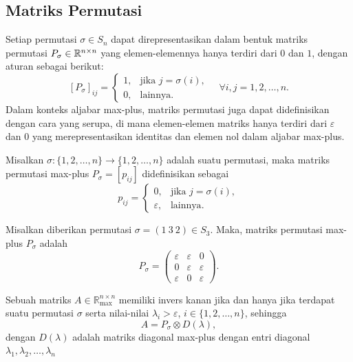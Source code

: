 \subsection{Matriks Permutasi}
Setiap permutasi $\sigma \in S_n$ dapat direpresentasikan dalam bentuk matriks permutasi $P_{\sigma}\in\mathbb{R}^{n \times n}$ yang elemen-elemennya hanya terdiri dari $0$ dan $1$, dengan aturan sebagai berikut:
\[
  [P_{\sigma}]_{ij} =
  \begin{cases}
    1, & \text{jika } j = \sigma(i), \\
    0, & \text{lainnya}.
  \end{cases} \quad \forall i, j = 1, 2, \ldots, n.
\]
Dalam konteks aljabar max-plus, matriks permutasi juga dapat didefinisikan dengan cara yang serupa, di mana elemen-elemen matriks hanya terdiri dari $\varepsilon$ dan $0$ yang merepresentasikan identitas dan elemen nol dalam aljabar max-plus.
\begin{definisi}\label{def:matriks_permutasi}
  Misalkan $\sigma : \{1,2,\dots,n\} \to \{1,2,\dots,n\}$
  adalah suatu permutasi, maka matriks permutasi max-plus
  $P_{\sigma} = [p_{ij}]$ didefinisikan sebagai
  \[
    p_{ij} =
    \begin{cases}
      0,           & \text{jika } j = \sigma(i), \\[4pt]
      \varepsilon, & \text{lainnya}.
    \end{cases}
  \]
\end{definisi}

\begin{contoh}
  Misalkan diberikan permutasi $\sigma=(1\ 3\ 2)\in S_3$. Maka, matriks permutasi max-plus $P_{\sigma}$ adalah
  \[
    P_{\sigma} =
    \begin{pmatrix}
      \varepsilon & \varepsilon & 0           \\
      0           & \varepsilon & \varepsilon \\
      \varepsilon & 0           & \varepsilon
    \end{pmatrix}.
  \]
\end{contoh}

\begin{teorema}
  Sebuah matriks $A \in \mathbb{R}_{\max}^{n \times n}$ memiliki invers kanan
  jika dan hanya jika terdapat suatu permutasi $\sigma$ serta nilai-nilai
  $\lambda_i > \varepsilon$, $i \in \{1,2,\dots,n\}$, sehingga
  \[
    A = P_{\sigma} \otimes D(\lambda),
  \]
  dengan $D(\lambda)$ adalah matriks diagonal max-plus dengan entri diagonal
  $\lambda_1, \lambda_2, \ldots, \lambda_n$
\end{teorema}

